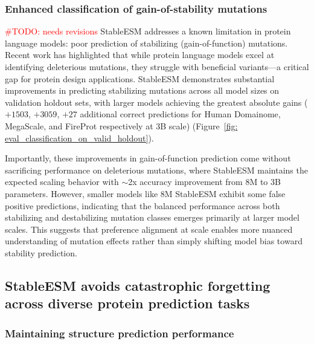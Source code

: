 \documentclass[]{fairmeta}
\begin{document}
\subsubsection{Enhanced classification of gain-of-stability mutations}

\indent \textcolor{red}{\#TODO: needs revisions} StableESM addresses a known limitation in protein language models: poor prediction of stabilizing (gain-of-function) mutations. Recent work has highlighted that while protein language models excel at identifying deleterious mutations, they struggle with beneficial variants—a critical gap for protein design applications. StableESM demonstrates substantial improvements in predicting stabilizing mutations across all model sizes on validation holdout sets, with larger models achieving the greatest absolute gains ($+1503$, $+3059$, $+27$ additional correct predictions for Human Domainome, MegaScale, and FireProt respectively at 3B scale) (Figure~\ref{fig: eval_classification_on_valid_holdout}).

Importantly, these improvements in gain-of-function prediction come without sacrificing performance on deleterious mutations, where StableESM maintains the expected scaling behavior with $\sim$2x accuracy improvement from 8M to 3B parameters. However, smaller models like 8M StableESM exhibit some false positive predictions, indicating that the balanced performance across both stabilizing and destabilizing mutation classes emerges primarily at larger model scales. This suggests that preference alignment at scale enables more nuanced understanding of mutation effects rather than simply shifting model bias toward stability prediction.

\subsection{StableESM avoids catastrophic forgetting across diverse protein prediction tasks}

\subsubsection{Maintaining structure prediction performance}
\end{document}
